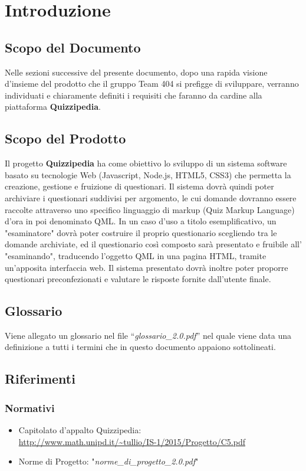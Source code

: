 \documentclass[a4paper,11pt]{article}
\begin{document}
	\newpage
	\section{Introduzione}
	\subsection{Scopo del Documento}
	Nelle sezioni successive del presente documento, dopo una rapida visione d'insieme del prodotto che il gruppo Team 404 si prefigge di sviluppare, verranno individuati e chiaramente definiti i requisiti che faranno da cardine alla piattaforma \textbf{Quizzipedia}.
	\subsection{Scopo del Prodotto}
	Il progetto \textbf{Quizzipedia} ha come obiettivo lo sviluppo di un sistema software basato su tecnologie Web (Javascript, Node.js, HTML5, CSS3) che permetta la creazione, gestione e fruizione di questionari. Il sistema dovrà quindi poter archiviare i questionari suddivisi per argomento, le cui domande dovranno essere raccolte attraverso uno specifico linguaggio di markup (Quiz Markup Language) d'ora in poi denominato QML. In un caso d'uso a titolo esemplificativo, un "esaminatore" dovrà poter costruire il proprio questionario scegliendo tra le domande archiviate, ed il questionario così composto sarà presentato e fruibile all' "esaminando", traducendo l'oggetto QML in una pagina HTML, tramite un'apposita interfaccia web. Il sistema presentato dovrà inoltre poter proporre questionari preconfezionati e valutare le risposte fornite dall'utente finale.
	\subsection{Glossario}
	Viene allegato un glossario nel file ``\textit{glossario\_2.0.pdf}'' nel quale viene data una definizione a tutti i termini che in questo documento appaiono sottolineati.
	\subsection{Riferimenti}
		\subsubsection{Normativi}
		\begin{itemize}
			\item Capitolato d'appalto Quizzipedia:\\
			\url{http://www.math.unipd.it/~tullio/IS-1/2015/Progetto/C5.pdf}
			\item Norme di Progetto: "\textit{norme\_di\_progetto\_2.0.pdf}"
		\end{itemize}
\end{document}
